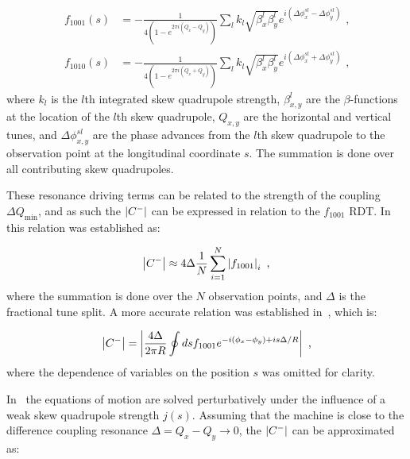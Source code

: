 \begin{equation}
    \begin{aligned}
        f_{1001}(s) &= - \frac{1}{4 \left(1 - e^{2 \pi i \left(Q_x - Q_y \right)}\right)} \sum_l k_l \sqrt{\beta_x^l \beta_y^l} e^{i \left(\Delta \phi_x^{s l} - \Delta \phi_y^{s l}\right)} \text{ ,} \\
        f_{1010}(s) &= - \frac{1}{4 \left(1 - e^{2 \pi i \left(Q_x + Q_y \right)}\right)} \sum_l k_l \sqrt{\beta_x^l \beta_y^l} e^{i \left(\Delta \phi_x^{s l} + \Delta \phi_y^{s l}\right)} \text{ ,}
    \end{aligned}
    \label{equation:coupling_rdts_from_skew_quads}
\end{equation}
where \(k_l\) is the \(l\)th integrated skew quadrupole strength, \(\beta_{x,y}^{l}\) are the \(\beta\)-functions at the location of the \(l\)th skew quadrupole, \(Q_{x,y}\) are the horizontal and vertical tunes, and \(\Delta \phi_{x,y}^{s l}\) are the phase advances from the \(l\)th skew quadrupole to the observation point at the longitudinal coordinate \(s\).
The summation is done over all contributing skew quadrupoles.

These resonance driving terms can be related to the strength of the coupling \(\Delta Q_{\mathrm{min}}\), and as such the \(\left\lvert C^{-} \right\rvert\) can be expressed in relation to the \(f_{1001}\) RDT.
In~\cite{PHD:Franchi} this relation was established as:

\begin{equation}
    \left\lvert C^{-} \right\rvert \approx 4 \Delta \frac{1}{N} \sum_{i=1}^N \left\lvert f_{1001} \right\rvert_i \text{ ,}
    \label{equation:deltaqmin_from_f1001_franchi}
\end{equation}
where the summation is done over the \(N\) observation points, and \(\Delta\) is the fractional tune split.
A more accurate relation was established in~\cite{PRAB:Persson:Improved_Control_Betatron_Coupling}, which is:

\begin{equation}
    \left\lvert C^{-} \right\rvert = \left\lvert \frac{4 \Delta}{2 \pi R} \oint d s f_{1001} e^{-i \left(\phi_x - \phi_y \right) + i s \Delta / R}  \right\rvert \text{ ,}
    \label{equation:deltaqmin_from_f1001}
\end{equation}
where the dependence of variables on the position \(s\) was omitted for clarity.

In~\cite{PHREV:Guignard:Betatron_Coupling_Radiation} the equations of motion are solved perturbatively under the influence of a weak skew quadrupole strength \(j(s)\).
Assuming that the machine is close to the difference coupling resonance \(\Delta = Q_x - Q_y \rightarrow 0\), the \(\left\lvert C^{-} \right\rvert\) can be approximated as:

